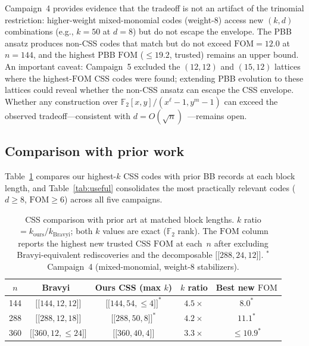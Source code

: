 \documentclass[aps,prxquantum,twocolumn,superscriptaddress,nofootinbib]{revtex4-2}
\newcommand{\FF}{\ensuremath{\mathbb{F}}}
\newcommand{\dblbrk}[1]{\ensuremath{\lbrack\!\lbrack #1 \rbrack\!\rbrack}}
\newcommand{\code}[1]{\dblbrk{#1}}
\newcommand{\FOM}{\ensuremath{\mathrm{FOM}}}
\begin{document}
Campaign~4 provides evidence that the tradeoff is not an artifact of the trinomial restriction: higher-weight mixed-monomial codes (weight-8) access new $(k,d)$ combinations (e.g., $k = 50$ at $d = 8$) but do not escape the envelope.
The PBB ansatz produces non-CSS codes that match but do not exceed $\FOM = 12.0$ at $n = 144$, and the highest PBB $\FOM$ ($\leq 19.2$, trusted) remains an upper bound.
An important caveat: Campaign~5 excluded the $(12,12)$ and $(15,12)$ lattices where the highest-$\FOM$ CSS codes were found; extending PBB evolution to these lattices could reveal whether the non-CSS ansatz can escape the CSS envelope. 
Whether any construction over $\FF_2[x,y]/(x^\ell{-}1, y^m{-}1)$ can exceed the observed tradeoff---consistent with $d = O(\sqrt{n})$~\cite{postema2025existence}---remains open.

\subsection{Comparison with prior work}
\label{sec:comparison}

Table~\ref{tab:comparison} compares our highest-$k$ CSS codes with prior BB records at each block length, and Table~\ref{tab:useful} consolidates the most practically relevant codes ($d \geq 8$, $\FOM \geq 6$) across all five campaigns.

\begin{table}[t]
\centering
\caption{CSS comparison with prior art at matched block lengths.
$k$ ratio $= k_{\text{ours}}/k_{\text{Bravyi}}$; both $k$ values are exact ($\FF_2$ rank).
The $\FOM$ column reports the highest new trusted CSS $\FOM$ at each~$n$ after excluding Bravyi-equivalent rediscoveries and the decomposable $\code{288,24,12}$.
$^*$Campaign~4 (mixed-monomial, weight-8 stabilizers).}
\label{tab:comparison}
\scriptsize
\setlength{\tabcolsep}{3pt}
\begin{tabular}{@{}ccccc@{}}
\toprule
$n$ & Bravyi~\cite{bravyi2024high} & Ours CSS (max $k$) & $k$ ratio & Best new $\FOM$ \\
\midrule
144 & $\code{144,12,12}$ & $\code{144,54,{\leq}4}^*$ & $4.5\times$ & $8.0^*$ \\
288 & $\code{288,12,18}$ & $\code{288,50,8}^*$ & $4.2\times$ & $11.1^*$ \\
360 & $\code{360,12,{\leq}24}$ & $\code{360,40,4}$ & $3.3\times$ & ${\leq}10.9^*$ \\
\bottomrule
\end{tabular}
\end{table}
\end{document}
